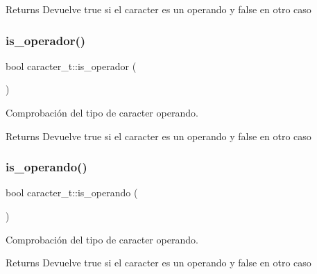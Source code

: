 \begin{DoxyReturn}{Returns}
Devuelve true si el caracter es un operando y false en otro caso 
\end{DoxyReturn}
\mbox{\label{classcaracter__t_a6e809f80ee947c95e5ab876744345a00}} 
\subsubsection{\texorpdfstring{is\+\_\+operador()}{is\_operador()}}
{\footnotesize\ttfamily bool caracter\+\_\+t\+::is\+\_\+operador (\begin{DoxyParamCaption}{ }\end{DoxyParamCaption})}



Comprobación del tipo de caracter operando. 

\begin{DoxyReturn}{Returns}
Devuelve true si el caracter es un operando y false en otro caso 
\end{DoxyReturn}
\mbox{\label{classcaracter__t_aafa8823c9f96891fcc9acbdadd54f197}} 
\subsubsection{\texorpdfstring{is\+\_\+operando()}{is\_operando()}}
{\footnotesize\ttfamily bool caracter\+\_\+t\+::is\+\_\+operando (\begin{DoxyParamCaption}{ }\end{DoxyParamCaption})}



Comprobación del tipo de caracter operando. 

\begin{DoxyReturn}{Returns}
Devuelve true si el caracter es un operando y false en otro caso 
\end{DoxyReturn}
\mbox{\label{classcaracter__t_a2f21204c13bd2befe3af92a99a0534ca}} 
